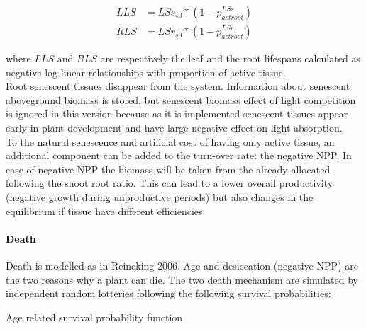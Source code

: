 \documentclass[a4paper,twoside, justified,marginals=raggedright, nobib]{tufte-handout}
\begin{document}
\begin{align}
LLS &= LSs_{s0} * (1- p_{act root}^{LSs_{1}}) \\
RLS &= LSr_{s0} * (1- p_{act root}^{LSr_{1}})
\end{align}


where $LLS$ and $RLS$ are respectively the leaf and the root lifespans calculated as negative log-linear relationships with proportion of active tissue.\\
\indent Root senescent tissues disappear from the system. Information about senescent aboveground biomass is stored, but senescent biomass effect of light competition is ignored in this version because as it is implemented senescent tissues appear early in plant development and have large negative effect on light absorption.\\
\indent To the natural senescence and artificial cost of having only active tissue, an additional component can be added to the turn-over rate: the negative NPP. In case of negative NPP the biomass will be taken from the already allocated following the shoot root ratio. This can lead to a lower overall productivity (negative growth during unproductive periods) but also changes in the equilibrium if tissue have different efficiencies.

\paragraph{Death} Death is modelled as in Reineking 2006. Age and desiccation (negative NPP) are the two reasons why a plant can die. The two death mechanism are simulated by independent random lotteries following the following survival probabilities:

\begin{marginfigure}[-10pt]
\label{fig:derivaives}
\caption{Age related survival probability function}
\end{marginfigure}
\end{document}
